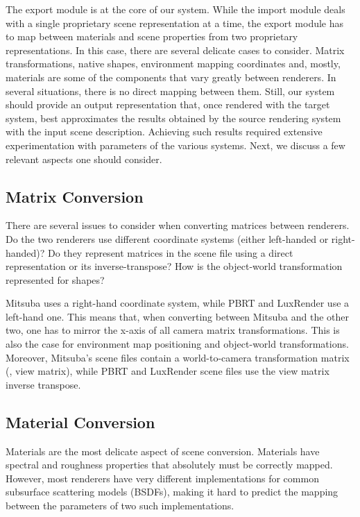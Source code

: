 The export module is at the core of our system. While the import module deals with a single proprietary scene representation at a time, the export module has to map between materials and scene properties from two proprietary representations. 
In this case, there are several delicate cases to consider. Matrix transformations, native shapes, environment mapping coordinates and, mostly, materials are
some of the components that vary greatly between renderers. In several situations, there is no direct mapping between them. Still, our system should provide an output representation that, once rendered with the target system, best approximates the results obtained by the source rendering system with the input scene description. 
Achieving such results required extensive experimentation with parameters of the various systems. Next, we discuss a few relevant aspects one should consider.    
  
\subsection{Matrix Conversion}
There are several issues to consider when converting matrices between renderers. Do the two renderers use different coordinate systems (either left-handed or right-handed)? Do they represent matrices in the scene file using a direct representation or its inverse-transpose? How is the object-world transformation represented for shapes?

Mitsuba uses a right-hand coordinate system, while PBRT and LuxRender use a left-hand one. This means that, when converting between Mitsuba and the other
two, one has to mirror the x-axis of all camera matrix transformations. This is also the case for environment map positioning and object-world transformations. Moreover, Mitsuba's scene files contain a world-to-camera transformation matrix (\ie, view matrix), while PBRT and LuxRender scene files use the view matrix inverse transpose.

\subsection{Material Conversion}
Materials are the most delicate aspect of scene conversion. Materials have spectral and roughness properties that absolutely must be correctly mapped. 
However, most renderers have very different implementations for common subsurface scattering models (BSDFs), making it hard to predict the mapping between the parameters of two such implementations.

